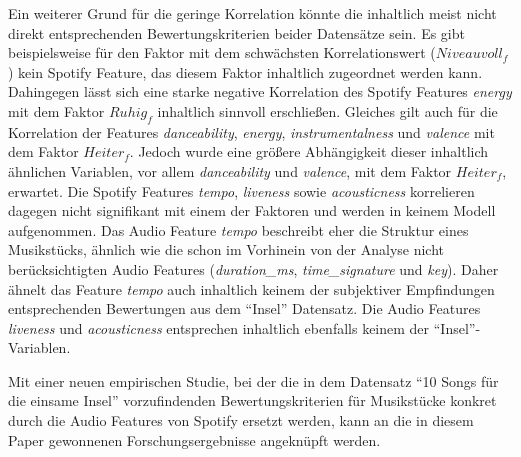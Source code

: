 Ein weiterer Grund für die geringe Korrelation könnte die inhaltlich meist nicht direkt entsprechenden Bewertungskriterien beider Datensätze sein.
Es gibt beispielsweise für den Faktor mit dem schwächsten Korrelationswert ($Niveauvoll_f$) kein Spotify Feature, das diesem Faktor inhaltlich zugeordnet werden kann.
Dahingegen lässt sich eine starke negative Korrelation des Spotify Features \textit{energy} mit dem Faktor $Ruhig_f$ inhaltlich sinnvoll erschließen.
Gleiches gilt auch für die Korrelation der Features \textit{danceability}, \textit{energy}, \textit{instrumentalness} und \textit{valence} mit dem Faktor $Heiter_f$.
Jedoch wurde eine größere Abhängigkeit dieser inhaltlich ähnlichen Variablen, vor allem \textit{danceability} und \textit{valence}, mit dem Faktor $Heiter_f$, erwartet.
Die Spotify Features \textit{tempo}, \textit{liveness} sowie \textit{acousticness} korrelieren dagegen nicht signifikant mit einem der Faktoren und werden in keinem Modell aufgenommen. 
Das Audio Feature \textit{tempo} beschreibt eher die Struktur eines Musikstücks, ähnlich wie die schon im Vorhinein von der Analyse nicht berücksichtigten Audio Features (\textit{duration\_ms}, \textit{time\_signature} und \textit{key}).
Daher ähnelt das Feature \textit{tempo} auch inhaltlich keinem der subjektiver Empfindungen entsprechenden Bewertungen aus dem "`Insel"' Datensatz.
Die Audio Features \textit{liveness} und \textit{acousticness} entsprechen inhaltlich ebenfalls keinem der "`Insel"'-Variablen.  

Mit einer neuen empirischen Studie, bei der die in dem Datensatz "`10 Songs für die einsame Insel"' vorzufindenden Bewertungskriterien für Musikstücke konkret durch die Audio Features von Spotify ersetzt werden, kann an die in diesem Paper gewonnenen Forschungsergebnisse angeknüpft werden.



